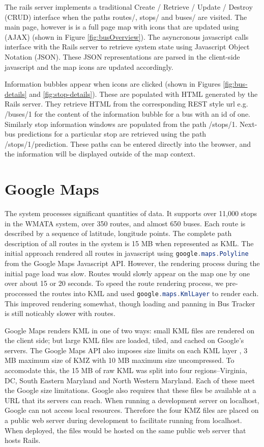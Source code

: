 \documentclass[12pt]{report}
\newcommand{\lstJava}{\lstinline[language=Java,breaklines=true]}
\begin{document}
The rails server implements a traditional Create / Retrieve / Update / Destroy (CRUD) interface when the paths routes/, stops/ and buses/ are visited.  The main page, however is is a full page map with icons that are updated using (AJAX) (shown in Figure \ref{fig:busOverview}).  The asyncronous javascript calls interface with the Rails server to retrieve system state using Javascript Object Notation (JSON).  These JSON representations are parsed in the client-side javascript and the map icons are updated accordingly.

Information bubbles appear when icons are clicked (shown in Figures \ref{fig:bus-details} and \ref{fig:stop-details}).  These are populated with HTML generated by the Rails server.  They retrieve HTML from the corresponding REST style url e.g. /buses/1 for the content of the information bubble for a bus with an id of one.  Similarly stop information windows are populated from the path /stops/1.  Next-bus predictions for a particular stop are retrieved using the path /stops/1/prediction.  These paths can be entered directly into the browser, and the information will be displayed outside of the map context.

\section{Google Maps}

The system processes significant quantities of data.  It supports over 11,000 stops in the WMATA system, over 350 routes, and almost 650 buses.  Each route is described by a sequence of latitude, longitude points.  The complete path description of all routes in the system is 15 MB when represented as KML.  The initial approach rendered all routes in javascript using \lstJava|google.maps.Polyline| from the Google Maps Javascript API.  However, the rendering process during the initial page load was slow.  Routes would slowly appear on the map one by one over about 15 or 20 seconds.  To speed the route rendering process, we pre-proccessed the routes into KML and used \lstJava|google.maps.KmlLayer| to render each.  This improved rendering somewhat, though loading and panning in Bus Tracker is still noticably slower with routes.

Google Maps renders KML in one of two ways: small KML files are rendered on the client side; but large KML files are loaded, tiled, and cached on Google's servers.  The Google Maps API also imposes size limits on each KML layer \cite{web:googlekml}, 3 MB maximum size of KMZ with 10 MB maximum size uncompressed.  To accomodate this, the 15 MB of raw KML was split into four regions--Virginia, DC, South Eastern Maryland and North Western Maryland.  Each of these meet the Google size limitations.  Google also requires that these files be available at a URL that its servers can reach.  When running a development server on localhost, Google can not access local resources.  Therefore the four KMZ files are placed on a public web server during development to facilitate running from localhost.  When deployed, the files would be hosted on the same public web server that hosts Rails.
\end{document}
